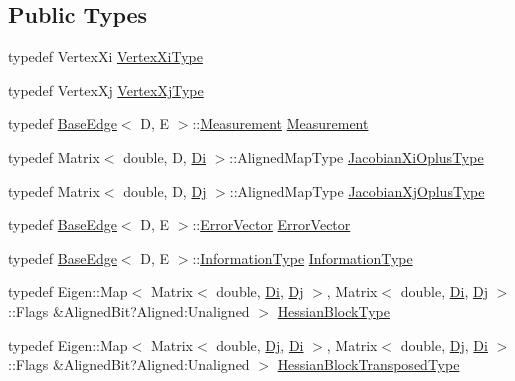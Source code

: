 \subsection*{Public Types}
\begin{DoxyCompactItemize}
\item 
typedef Vertex\+Xi \hyperlink{classg2o_1_1BaseBinaryEdge_aa8e2b04b2c0c90adc48384d6d41063cc}{Vertex\+Xi\+Type}
\item 
typedef Vertex\+Xj \hyperlink{classg2o_1_1BaseBinaryEdge_aa489ae37680c37d7b2c3c1a197f90de9}{Vertex\+Xj\+Type}
\item 
typedef \hyperlink{classg2o_1_1BaseEdge}{Base\+Edge}$<$ D, E $>$\+::\hyperlink{classg2o_1_1BaseBinaryEdge_ac1e9249e9906747a6669a9c90013944b}{Measurement} \hyperlink{classg2o_1_1BaseBinaryEdge_ac1e9249e9906747a6669a9c90013944b}{Measurement}
\item 
typedef Matrix$<$ double, D, \hyperlink{classg2o_1_1BaseBinaryEdge_abfe232196405a7204bc299a747c1cc8b}{Di} $>$\+::Aligned\+Map\+Type \hyperlink{classg2o_1_1BaseBinaryEdge_ab1cde84224b129603bcd95db027e0167}{Jacobian\+Xi\+Oplus\+Type}
\item 
typedef Matrix$<$ double, D, \hyperlink{classg2o_1_1BaseBinaryEdge_ab718b94950a34d589371fe6f5583b259}{Dj} $>$\+::Aligned\+Map\+Type \hyperlink{classg2o_1_1BaseBinaryEdge_a83e5dec2135b33e86255c87be3b5d062}{Jacobian\+Xj\+Oplus\+Type}
\item 
typedef \hyperlink{classg2o_1_1BaseEdge}{Base\+Edge}$<$ D, E $>$\+::\hyperlink{classg2o_1_1BaseBinaryEdge_ae1cccf6068b2446ece316b6a69a46acf}{Error\+Vector} \hyperlink{classg2o_1_1BaseBinaryEdge_ae1cccf6068b2446ece316b6a69a46acf}{Error\+Vector}
\item 
typedef \hyperlink{classg2o_1_1BaseEdge}{Base\+Edge}$<$ D, E $>$\+::\hyperlink{classg2o_1_1BaseBinaryEdge_a4530ef6462aadaf2ab826d440d3b3318}{Information\+Type} \hyperlink{classg2o_1_1BaseBinaryEdge_a4530ef6462aadaf2ab826d440d3b3318}{Information\+Type}
\item 
typedef Eigen\+::\+Map$<$ Matrix$<$ double, \hyperlink{classg2o_1_1BaseBinaryEdge_abfe232196405a7204bc299a747c1cc8b}{Di}, \hyperlink{classg2o_1_1BaseBinaryEdge_ab718b94950a34d589371fe6f5583b259}{Dj} $>$, Matrix$<$ double, \hyperlink{classg2o_1_1BaseBinaryEdge_abfe232196405a7204bc299a747c1cc8b}{Di}, \hyperlink{classg2o_1_1BaseBinaryEdge_ab718b94950a34d589371fe6f5583b259}{Dj} $>$\+::Flags \&Aligned\+Bit?Aligned\+:\+Unaligned $>$ \hyperlink{classg2o_1_1BaseBinaryEdge_a7eadbbe6abffe4d2ebdf6231272789a5}{Hessian\+Block\+Type}
\item 
typedef Eigen\+::\+Map$<$ Matrix$<$ double, \hyperlink{classg2o_1_1BaseBinaryEdge_ab718b94950a34d589371fe6f5583b259}{Dj}, \hyperlink{classg2o_1_1BaseBinaryEdge_abfe232196405a7204bc299a747c1cc8b}{Di} $>$, Matrix$<$ double, \hyperlink{classg2o_1_1BaseBinaryEdge_ab718b94950a34d589371fe6f5583b259}{Dj}, \hyperlink{classg2o_1_1BaseBinaryEdge_abfe232196405a7204bc299a747c1cc8b}{Di} $>$\+::Flags \&Aligned\+Bit?Aligned\+:\+Unaligned $>$ \hyperlink{classg2o_1_1BaseBinaryEdge_aec0d5b1819f702b7658574fcd6324b49}{Hessian\+Block\+Transposed\+Type}
\end{DoxyCompactItemize}
